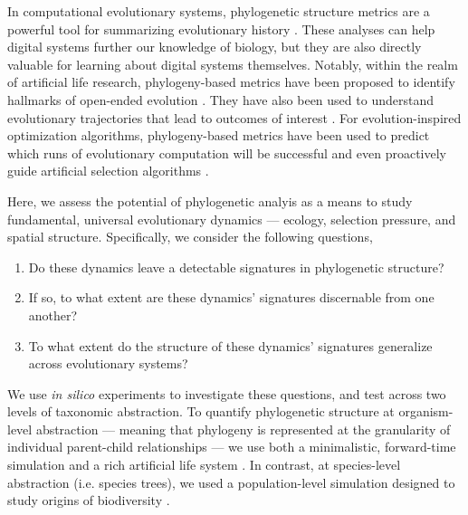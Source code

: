 In computational evolutionary systems, phylogenetic structure metrics are a powerful tool for summarizing evolutionary history \citep{dolson2020interpreting}.
These analyses can help digital systems further our knowledge of biology, but they are also directly valuable for learning about digital systems themselves.
Notably, within the realm of artificial life research, phylogeny-based metrics have been proposed to identify hallmarks of open-ended evolution \citep{dolsonMODESToolboxMeasurements2019}.
They have also been used to understand evolutionary trajectories that lead to outcomes of interest \citep{lenskiEvolutionaryOriginComplex2003,lalejiniEvolutionaryOriginsPhenotypic2016,johnsonEndosymbiosisBustInfluence2022a}.
For evolution-inspired optimization algorithms, phylogeny-based metrics have been used to predict which runs of evolutionary computation will be successful \citep{hernandezWhatCanPhylogenetic2022a,shahbandeganUntanglingPhylogeneticDiversity2022a,ferguson2023potentiating} and even proactively guide artificial selection algorithms \citep{lalejini2024phylogeny,burke2003increased}.

Here, we assess the potential of phylogenetic analyis as a means to study fundamental, universal evolutionary dynamics --- ecology, selection pressure, and spatial structure.
Specifically, we consider the following questions,
\begin{enumerate}
  \item Do these dynamics leave a detectable signatures in phylogenetic structure?
  \item If so, to what extent are these dynamics' signatures discernable from one another?
  \item To what extent do the structure of these dynamics' signatures generalize across evolutionary systems?
\end{enumerate}

We use \textit{in silico} experiments to investigate these questions, and test across two levels of taxonomic abstraction.
To quantify phylogenetic structure at organism-level abstraction --- meaning that phylogeny is represented at the granularity of individual parent-child relationships --- we use both a minimalistic, forward-time simulation and a rich artificial life system \citep{ofria2004avida}.
In contrast, at species-level abstraction (i.e. species trees), we used a population-level simulation designed to study origins of biodiversity \citep{hagen2021gen3sis}.

